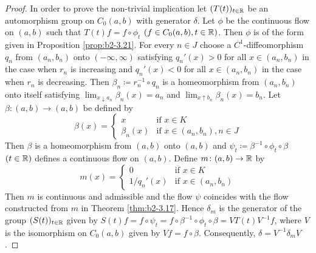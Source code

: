 \begin{proof}
In order to prove the non-trivial implication let $(T(t))_{t \in \mathbb{R}}$ be an automorphism group on $C_{0}(a,b)$ with generator $\delta$.
Let $\phi$ be the continuous flow on $(a,b)$ such that $T(t)f = f \circ \phi_{t}$ $(f \in C_{0}(a,b), t \in \mathbb{R})$.
Then $\phi$ is of the form given in Proposition \ref{prop:b2-3.21}.
For every $n \in J$ choose a $C^{1}$-diffeomorphism $q_{n}$ from $(a_{n},b_{n})$ onto $(-\infty,\infty)$ satisfying $q_{n}'(x) > 0$ for all $x \in (a_{n},b_{n})$ in the case when $r_{n}$ is increasing and $q_{n}'(x) < 0$ for all $x \in (a_{n},b_{n})$ in the case when $r_{n}$ is decreasing.
Then $\beta_{n} \coloneqq r_{n}^{-1} \circ q_{n}$ is a homeomorphism from $(a_{n},b_{n})$ onto itself satisfying $\lim_{x \downarrow a_{n}}\beta_{n}(x) = a_{n}$ and $\lim_{x \uparrow b_{n}}\beta_{n}(x) = b_{n}$.
Let $\beta \colon (a,b) \to (a,b)$ be defined by
\begin{equation*}\label{eq:b2-beta}
\beta(x) = \begin{cases}
    x & \text{if } x \in K \\
    \beta_{n}(x) & \text{if } x \in (a_{n},b_{n}), n \in J
\end{cases}
\end{equation*}
Then $\beta$ is a homeomorphism from $(a,b)$ onto $(a,b)$ and $\psi_{t} \coloneqq \beta^{-1} \circ \phi_{t} \circ \beta$ $(t \in \mathbb{R})$ defines a continuous flow on $(a,b)$.
Define $m \colon (a,b) \to \mathbb{R}$ by
\begin{equation*}\label{eq:b2-m-def2}
m(x) = \begin{cases}
    0 & \text{if } x \in K \\
    1/q_{n}'(x) & \text{if } x \in (a_{n},b_{n})
\end{cases}
\end{equation*}
Then $m$ is continuous and admissible and the flow $\psi$ coincides with the flow constructed from $m$ in Theorem \ref{thm:b2-3.17}.
Hence $\delta_{m}$ is the generator of the group $(S(t))_{t \in \mathbb{R}}$ given by $S(t)f = f \circ \psi_{t} = f \circ \beta^{-1} \circ \phi_{t} \circ \beta = VT(t)V^{-1}f$, where $V$ is the isomorphism on $C_{0}(a,b)$ given by $Vf = f \circ \beta$.
Consequently, $\delta = V^{-1}\delta_{m}V$.
\end{proof}

